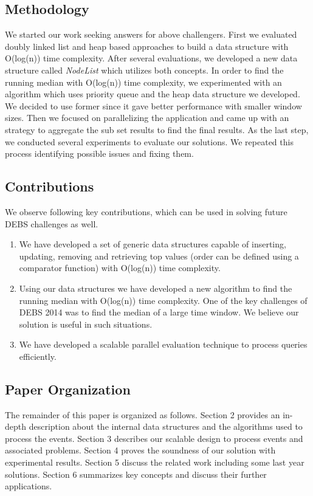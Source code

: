 \subsection{Methodology}

We started our work seeking answers for above challengers. First we evaluated doubly linked list and heap based approaches to build a data structure with O(log(n)) time complexity. After several evaluations, we developed a new data structure called \textit{NodeList} which utilizes both concepts. In order to find the running median with O(log(n)) time complexity, we experimented with an algorithm which uses priority queue and the heap data structure we developed. We decided to use former since it gave better performance with smaller window sizes. Then we focused on parallelizing the application and came up with an strategy to aggregate the sub set results to find the final results. As the last step, we conducted several experiments to evaluate our solutions. We repeated this process identifying possible issues and fixing them.


\subsection{Contributions}
We observe following key contributions, which can be used in solving future DEBS challenges as well.
\begin{enumerate}
	\item We have developed a set of  generic data structures capable of inserting, updating, removing and retrieving top values (order can be defined using a comparator function) with O(log(n)) time complexity. 
	\item Using our data structures we have developed a new algorithm to find the running median with O(log(n)) time complexity. One of the key challenges of DEBS 2014 \cite{jerzak2014debs}  was to find the median of a large time window. We believe our solution is useful in such situations.
	\item We have developed a scalable parallel evaluation technique to process queries efficiently. 
\end{enumerate}

\subsection{Paper Organization}
The remainder of this paper is organized as follows. Section 2 provides an in-depth description about the internal data structures and the algorithms used to process the events. Section 3 describes our scalable design to process events and associated problems. Section 4 proves the soundness of our solution with experimental results. Section 5 discuss the related work including some last year solutions. Section 6 summarizes key concepts and discuss their further applications. 
